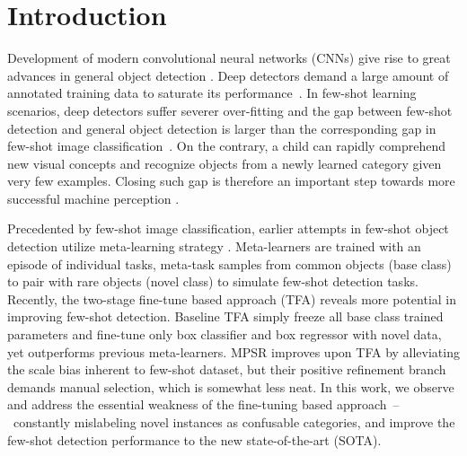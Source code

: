 \documentclass[final]{cvpr}
\begin{document}
\section{Introduction}
Development of modern convolutional neural networks (CNNs) \cite{he_deep_2015,cai_cascade_2017,zhu_deformable_2018} give rise to great advances in general object detection \cite{ren_faster_2016,lin_focal_2018,tian_fcos_2019}. Deep detectors demand a large amount of annotated training data to saturate its performance~\cite{tan_efficientdet_2020,wang_cspnet_2019}. In few-shot learning scenarios, deep detectors suffer severer over-fitting and the gap between few-shot detection and general object detection is larger than the corresponding gap in few-shot image classification~\cite{wang_low-shot_2018,khodadadeh_unsupervised_2019,ren_meta-learning_2018}. On the contrary, a child can rapidly comprehend new visual concepts and recognize objects from a newly learned category given very few examples. Closing such gap is therefore an important step towards more successful machine perception \cite{funke_five_2020}. 

Precedented by few-shot image classification, earlier attempts in few-shot object detection utilize meta-learning strategy \cite{yan_meta_2020,wang_meta-learning_2019,xiao_few_shot_2020}. Meta-learners are trained with an episode of individual tasks, meta-task samples from common objects (base class) to pair with rare objects (novel class) to simulate few-shot detection tasks. Recently, the two-stage fine-tune based approach (TFA) reveals more potential in improving few-shot detection. Baseline TFA \cite{wang_frustratingly_2020} simply freeze all base class trained parameters and fine-tune only box classifier and box regressor with novel data, yet outperforms previous meta-learners. MPSR \cite{wu_multi-scale_2020} improves upon TFA by alleviating the scale bias inherent to few-shot dataset, but their positive refinement branch demands manual selection, which is somewhat less neat. In this work, we observe and address the essential weakness of the fine-tuning based approach~--~constantly mislabeling novel instances as confusable categories, and improve the few-shot detection performance to the new state-of-the-art (SOTA).
\end{document}
